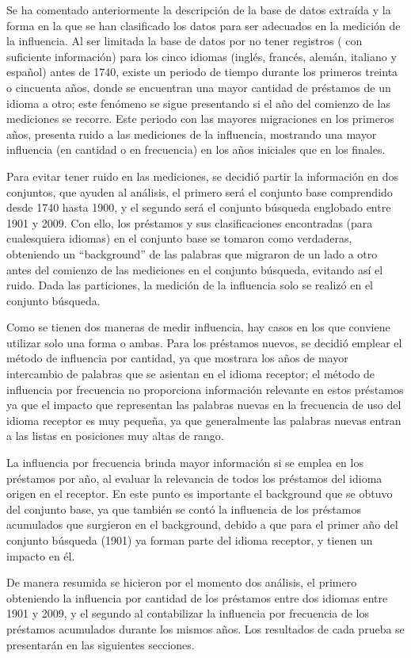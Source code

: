 Se ha comentado anteriormente la descripción de la base de datos extraída y la forma en la que se han clasificado los datos para ser adecuados en la medición de la influencia.  Al ser limitada la base de datos por no tener registros ( con suficiente información) para los cinco idiomas (inglés, francés, alemán, italiano y español) antes de 1740,  existe un periodo de tiempo durante los primeros treinta o cincuenta años, donde se encuentran una mayor cantidad de préstamos de un idioma a otro; este fenómeno se sigue presentando si el año del comienzo de las mediciones se recorre.  Este periodo con las mayores migraciones en los primeros años, presenta ruido a las mediciones de la influencia, mostrando una mayor influencia (en cantidad o en frecuencia)  en los años iniciales que en los finales.

Para evitar tener ruido en las mediciones, se decidió partir la información en dos conjuntos, que ayuden al análisis, el primero será el conjunto base comprendido desde 1740 hasta 1900, y el segundo será el conjunto búsqueda englobado entre 1901 y 2009.  Con ello,  los préstamos y sus clasificaciones encontradas (para cualesquiera idiomas) en el conjunto base  se tomaron como verdaderas,  obteniendo un “background” de las palabras que migraron de un lado a otro  antes del comienzo de las mediciones en el conjunto búsqueda, evitando así el ruido.  Dada las particiones, la medición de la influencia solo se realizó en el conjunto búsqueda.

Como se tienen dos maneras de medir influencia,  hay casos en los que conviene utilizar solo una forma o ambas.  Para los préstamos nuevos, se decidió emplear el método de influencia por cantidad, ya que mostrara los años de mayor intercambio de palabras que se asientan en el idioma receptor; el método de influencia por frecuencia no proporciona información relevante en estos préstamos ya que el impacto que representan las palabras nuevas en la frecuencia de uso del idioma receptor es muy pequeña, ya que generalmente las palabras nuevas entran a las listas en posiciones muy altas de rango.  

La influencia por frecuencia brinda mayor información si se emplea en los préstamos por año, al evaluar la relevancia de todos los préstamos del idioma origen en el receptor. En este punto es importante el background que se obtuvo del conjunto base, ya que también se contó la influencia de los préstamos acumulados que surgieron en el background, debido a que para el primer año del conjunto búsqueda (1901) ya forman parte del idioma receptor, y tienen un impacto en él. 

De manera resumida se hicieron por el momento dos análisis, el primero obteniendo la influencia por cantidad de los préstamos entre dos idiomas entre 1901 y 2009, y el segundo al contabilizar la influencia por frecuencia de los préstamos acumulados durante los mismos años.  Los resultados de cada prueba se presentarán en las siguientes secciones. 


